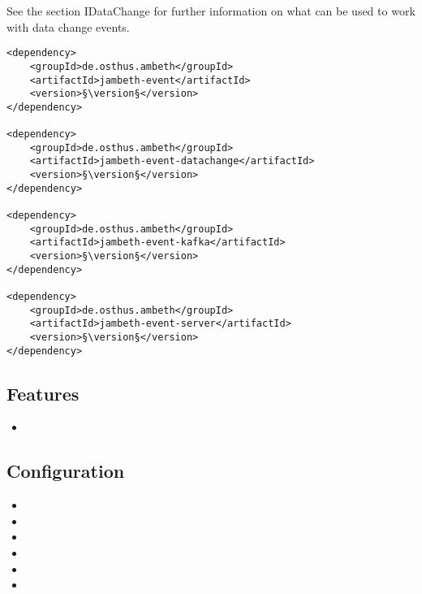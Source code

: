 See the section IDataChange for further information on what can be used to work with data change events.


\begin{lstlisting}[style=POM,caption={Maven modules to use \emph{Ambeth Event}}]
<dependency>
	<groupId>de.osthus.ambeth</groupId>
	<artifactId>jambeth-event</artifactId>
	<version>§\version§</version>
</dependency>

<dependency>
	<groupId>de.osthus.ambeth</groupId>
	<artifactId>jambeth-event-datachange</artifactId>
	<version>§\version§</version>
</dependency>

<dependency>
	<groupId>de.osthus.ambeth</groupId>
	<artifactId>jambeth-event-kafka</artifactId>
	<version>§\version§</version>
</dependency>

<dependency>
	<groupId>de.osthus.ambeth</groupId>
	<artifactId>jambeth-event-server</artifactId>
	<version>§\version§</version>
</dependency>
\end{lstlisting}
\subsection{Features}
\begin{itemize}
	\item \TODO
\end{itemize}

\subsection{Configuration}
\begin{itemize}
	\item {}
	\item {}
	\item {}
	\item {}
	\item {}
	\item {}
\end{itemize}
